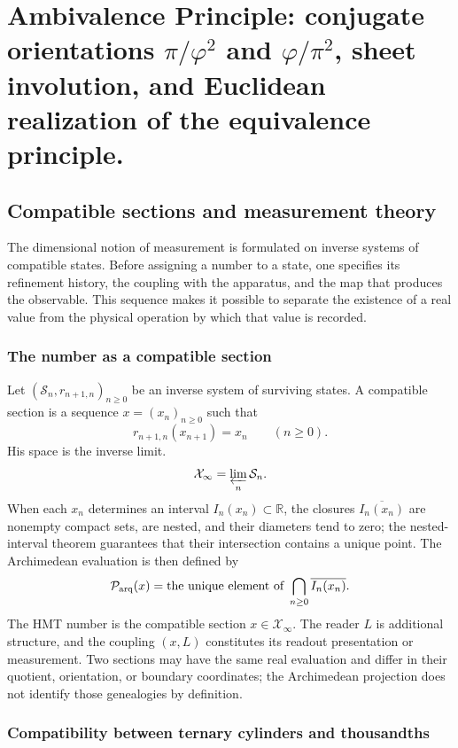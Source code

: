 \chapter{Ambivalence Principle: conjugate orientations \texorpdfstring{\(\pi/\varphi^2\)}{π/φ²} and \texorpdfstring{\(\varphi/\pi^2\)}{φ/π²}, sheet involution, and Euclidean realization of the equivalence principle.}
\label{chap:83-16}

\section{Compatible sections and measurement theory}
\label{p12-83-c16-s1:chap:medida}

The dimensional notion of measurement is formulated on inverse systems of
compatible states. Before assigning a number to a state, one specifies its refinement
history, the coupling with the apparatus, and the map that produces the
observable. This sequence makes it possible to separate the existence of a real value from
the physical operation by which that value is recorded.

\subsection{The number as a compatible section}

Let \((\mathcal S_n,r_{n+1,n})_{n\geq0}\) be an inverse system of
surviving states. A compatible section is a sequence
\(x=(x_n)_{n\geq0}\) such that
\[
 r_{n+1,n}(x_{n+1})=x_n
 \qquad(n\geq0).
\]
His space is the inverse limit.
\[
 \mathcal X_\infty=\varprojlim_n\mathcal S_n.
\]
When each \(x_n\) determines an interval \(I_n(x_n)\subset\mathbb R\), the
closures \(\overline{I_n(x_n)}\) are nonempty compact sets, are nested, and
their diameters tend to zero; the nested-interval theorem guarantees
that their intersection contains a unique point. The Archimedean evaluation is
then defined by
\[
 \mathcal P_{\rm arq}(x)
 =\text{the unique element of }
   \bigcap_{n\geq0}\overline{I_n(x_n)}.
\]
The HMT number is the compatible section
\(x\in\mathcal X_\infty\). The reader \(L\) is additional structure, and the
coupling \((x,L)\) constitutes its readout presentation or measurement. Two
sections may have the same real evaluation and differ in their quotient,
orientation, or boundary coordinates; the Archimedean projection does not identify
those genealogies by definition.

\subsection{Compatibility between ternary cylinders and thousandths}

